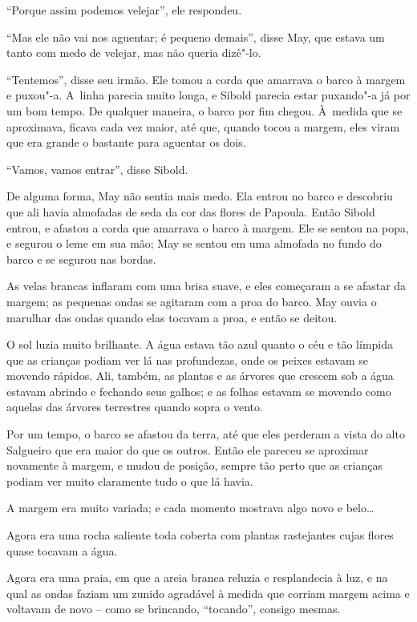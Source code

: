 ``Porque assim podemos velejar'', ele respondeu.

``Mas ele não vai nos aguentar; é pequeno demais'', disse May, que
estava um tanto com medo de velejar, mas não queria dizê"-lo.

``Tentemos'', disse seu irmão. Ele tomou a corda que amarrava o barco à
margem e puxou"-a. A~linha parecia muito longa, e Sibold parecia estar
puxando"-a já por um bom tempo. De qualquer maneira, o barco por fim
chegou. À~medida que se aproximava, ficava cada vez maior, até que,
quando tocou a margem, eles viram que era grande o bastante para
aguentar os dois.

``Vamos, vamos entrar'', disse Sibold.

De alguma forma, May não sentia mais medo. Ela entrou no barco e
descobriu que ali havia almofadas de seda da cor das flores de Papoula.
Então Sibold entrou, e afastou a corda que amarrava o barco à margem.
Ele se sentou na popa, e segurou o leme em sua mão; May se sentou em uma
almofada no fundo do barco e se segurou nas bordas.

As velas brancas inflaram com uma brisa suave, e eles começaram a se
afastar da margem; as pequenas ondas se agitaram com a proa do barco.
May ouvia o marulhar das ondas quando elas tocavam a proa, e então se
deitou.

O sol luzia muito brilhante. A água estava tão azul quanto o céu e tão
límpida que as crianças podiam ver lá nas profundezas, onde os peixes
estavam se movendo rápidos. Ali, também, as plantas e as árvores que
crescem sob a água estavam abrindo e fechando seus galhos; e as folhas
estavam se movendo como aquelas das árvores terrestres quando sopra o
vento.

Por um tempo, o barco se afastou da terra, até que eles perderam a vista
do alto Salgueiro que era maior do que os outros. Então ele pareceu se
aproximar novamente à margem, e mudou de posição, sempre tão perto que
as crianças podiam ver muito claramente tudo o que lá havia.

A margem era muito variada; e cada momento mostrava algo novo e
belo…

Agora era uma rocha saliente toda coberta com plantas rastejantes cujas
flores quase tocavam a água.

Agora era uma praia, em que a areia branca reluzia e resplandecia à luz,
e na qual as ondas faziam um zunido agradável à medida que corriam
margem acima e voltavam de novo -- como se brincando, ``tocando'',
consigo mesmas.

